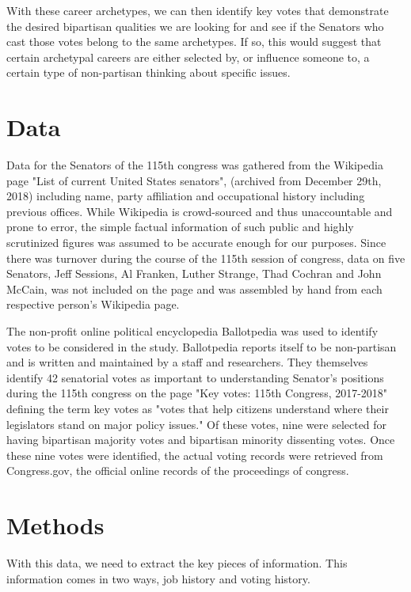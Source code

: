 \documentclass[11pt,twocolumn]{article}
\begin{document}
With these career archetypes, we can then identify key votes that demonstrate the desired bipartisan qualities we are looking for and see if the Senators who cast those votes belong to the same archetypes. If so, this would suggest that certain archetypal careers are either selected by, or influence someone to, a certain type of non-partisan thinking about specific issues.

\section{Data}
Data for the Senators of the 115th congress was gathered from the Wikipedia page "List of current United States senators", (archived from December 29th, 2018) including name, party affiliation and occupational history including previous offices. While Wikipedia is crowd-sourced and thus unaccountable and prone to error, the simple factual information of such public and highly scrutinized figures was assumed to be accurate enough for our purposes. Since there was turnover during the course of the 115th session of congress, data on five Senators, Jeff Sessions, Al Franken, Luther Strange, Thad Cochran and John McCain, was not included on the page and was assembled by hand from each respective person's Wikipedia page.
	
The non-profit online political encyclopedia Ballotpedia was used to identify votes to be considered in the study. Ballotpedia reports itself to be non-partisan and is written and maintained by a staff and researchers. They themselves identify 42 senatorial votes as important to understanding Senator's positions during the 115th congress on the page "Key votes: 115th Congress, 2017-2018" defining the term key votes as "votes that help citizens understand where their legislators stand on major policy issues." Of these votes, nine were selected for having bipartisan majority votes and bipartisan minority dissenting votes. Once these nine votes were identified, the actual voting records were retrieved from Congress.gov, the official online records of the proceedings of congress.
	
	\section{Methods}
With this data, we need to extract the key pieces of information. This information comes in two ways, job history and voting history.
\end{document}
